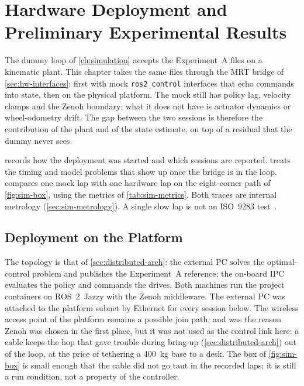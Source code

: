 \chapter{Hardware Deployment and Preliminary Experimental Results}
\label{ch:hardware}

The dummy loop of \cref{ch:simulation} accepts the Experiment~A files on
a kinematic plant. This chapter takes the same files through the MRT
bridge of \cref{sec:hw-interfaces}: first with mock
\texttt{ros2\_control} interfaces that echo commands into state, then on
the physical \hero{} platform. The mock still has policy lag, velocity
clamps and the Zenoh boundary; what it does not have is actuator
dynamics or wheel-odometry drift. The gap between the two sessions is
therefore the contribution of the plant and of the state estimate, on
top of a residual that the dummy never sees.

 records how the deployment was started
and which sessions are reported.  treats the
timing and model problems that show up once the bridge is in the loop.
 compares one mock lap with one hardware lap on the
eight-corner path of \cref{fig:sim-box}, using the metrics of
\cref{tab:sim-metrics}. Both traces are internal metrology
(\cref{sec:sim-metrology}). A single slow lap is not an ISO~9283
test~\cite{ISO9283}.

\section{Deployment on the \hero{} Platform}
\label{sec:hw-deployment}

The topology is that of \cref{sec:distributed-arch}: the
external PC solves the optimal-control problem and publishes the
Experiment~A reference; the on-board IPC evaluates the policy and
commands the drives. Both machines run the project containers on
ROS~2~Jazzy with the Zenoh middleware. The external PC was attached to
the platform subnet by Ethernet for every session below. The wireless
access point of the platform remains a possible join path, and was the
reason Zenoh was chosen in the first place, but it was not used as the
control link here: a cable keeps the hop that gave trouble during
bring-up (\cref{sec:distributed-arch}) out of the loop, at the price of
tethering a \qty{400}{\kilo\gram} base to a desk. The box of \cref{fig:sim-box} is small enough that the cable did
not go taut in the recorded laps; it is still a run condition, not a
property of the controller.

